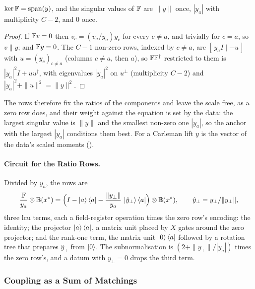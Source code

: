 \begin{proposition}
\label{prop:ratio-rows}
$\ker\mathbb{F}=\operatorname{span}(y)$, and the singular values of $\mathbb{F}$ are $\|y\|$ once, $|y_a|$ with multiplicity $C-2$, and $0$ once.
\end{proposition}
\begin{proof}
If $\mathbb{F} v=0$ then $v_c=(v_a/y_a)y_c$ for every $c\ne a$, and trivially for $c=a$, so $v\parallel y$; and $\mathbb{F} y=0$. The $C-1$ non-zero rows, indexed by $c\ne a$, are $[\,y_aI\mid-u\,]$ with $u=(y_c)_{c\ne a}$ (columns $c\ne a$, then $a$), so $\mathbb{F}\mathbb{F}^\dagger$ restricted to them is $|y_a|^2I+uu^\dagger$, with eigenvalues $|y_a|^2$ on $u^\perp$ (multiplicity $C-2$) and $|y_a|^2+\|u\|^2=\|y\|^2$.
\end{proof}
The rows therefore fix the ratios of the components and leave the scale free, as a zero row does, and their weight against the equation is set by the data: the largest singular value is $\|y\|$ and the smallest non-zero one $|y_a|$, so the anchor with the largest $|y_a|$ conditions them best. For a Carleman lift $y$ is the vector of the data's scaled moments ().

\paragraph{Circuit for the Ratio Rows.} Divided by $y_a$, the rows are
\begin{equation}
    \frac{\mathbb{F}}{y_a}\otimes\mathbb{B}(x^*)
    =\Bigl(I-\ket{a}\bra{a}-\frac{\|y_\perp\|}{y_a}\,\ket{\hat y_\perp}\bra{a}\Bigr)\otimes\mathbb{B}(x^*),
    \qquad \hat y_\perp=y_\perp/\|y_\perp\|,
\end{equation}
three \gls{lcu} terms, each a field-register operation times the zero row's encoding: the identity; the projector $\ket{a}\bra{a}$, a matrix unit placed by $X$ gates around the zero projector; and the rank-one term, the matrix unit $\ket{0}\bra{a}$ followed by a rotation tree that prepares $\hat y_\perp$ from $\ket{0}$. The subnormalisation is $(2+\|y_\perp\|/|y_a|)$ times the zero row's, and a datum with $y_\perp=0$ drops the third term.

\subsubsection{Coupling as a Sum of Matchings}
\label{app:matchings}

